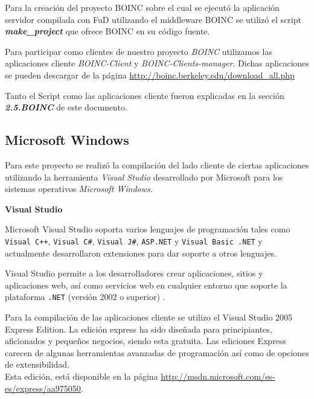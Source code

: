 Para la creación del proyecto BOINC sobre el cual se ejecutó la aplicación servidor compilada con FuD utilizando el middleware BOINC
 se utilizó el script \textbf{\textit{make\_project}} que ofrece BOINC en su código fuente. 

Para participar como clientes de nuestro proyecto \textit{BOINC} utilizamos las aplicaciones cliente \textit{BOINC-Client} y \textit{BOINC-Clients-manager}.
Dichas aplicaciones se pueden descargar de la página \url{http://boinc.berkeley.edu/download_all.php}

Tanto el Script como las aplicaciones cliente fueron explicadas en la sección \textbf{\textit{2.5.BOINC}} de este documento.


\subsection{Microsoft Windows}

Para este proyecto se realizó la compilación del lado cliente de ciertas aplicaciones utilizando la herramienta \textit{Visual Studio} 
desarrollado por Microsoft para los  sistemas operativos \textit{Microsoft Windows}. 

\vspace{0.5cm}

\begin{description}

 \item \textbf{Visual Studio}

Microsoft Visual Studio soporta varios lenguajes de programación tales como \texttt{Visual C++}, \texttt{Visual C\#}, \texttt{Visual J\#}, 
\texttt{ASP.NET} y \texttt{Visual Basic .NET} y actualmente desarrollaron extensiones para dar soporte a otros lenguajes.

Visual Studio permite a los desarrolladores crear aplicaciones, sitios y aplicaciones web, así como servicios web en
 cualquier entorno que soporte la plataforma \texttt{.NET} (versión 2002 o superior) . 

Para la compilación de las aplicaciones cliente se utilizo el Visual Studio 2005 Express Edition. La edición express ha sido diseñada para principiantes, aficionados y pequeños negocios, 
siendo esta gratuita. Las ediciones Express carecen de algunas herramientas avanzadas de programación así como de opciones de extensibilidad.\\
Esta edición, está disponible en la página \url{http://msdn.microsoft.com/es-es/express/aa975050}. 

\end{description}

